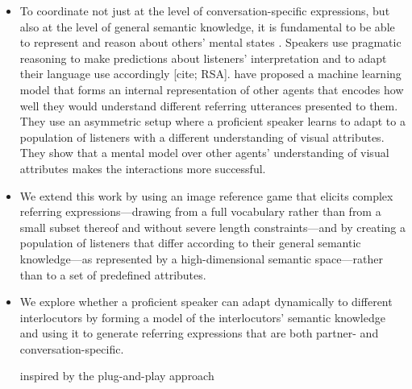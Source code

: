 \begin{itemize}
\item To coordinate not just at the level of conversation-specific expressions, but also at the level of general semantic knowledge, it is fundamental to be able to represent and reason about others’ mental states \cite{premack1978tom}. Speakers use pragmatic reasoning to make predictions about listeners' interpretation and to adapt their language use accordingly [cite; RSA]. \citet{corona2019modeling} have proposed a machine learning model that forms an internal  representation of other agents that encodes how well they would understand different referring utterances presented to them. They use an asymmetric setup where a proficient speaker learns to adapt to a population of listeners with a different understanding of visual attributes. They show that a mental model over other agents’ understanding of visual attributes makes the interactions more successful.

\item We extend this work by using an image reference game that elicits complex referring expressions---drawing from a full vocabulary rather than from a small subset thereof and without severe length constraints---and by creating a population of listeners that differ according to their general semantic knowledge---as represented by a high-dimensional semantic space---rather than to a set of predefined attributes.

\item We explore whether a proficient speaker can adapt dynamically to different interlocutors by forming a model of the interlocutors' semantic knowledge and using it to generate referring expressions that are both partner- and conversation-specific.

inspired by the plug-and-play approach 


\end{itemize}